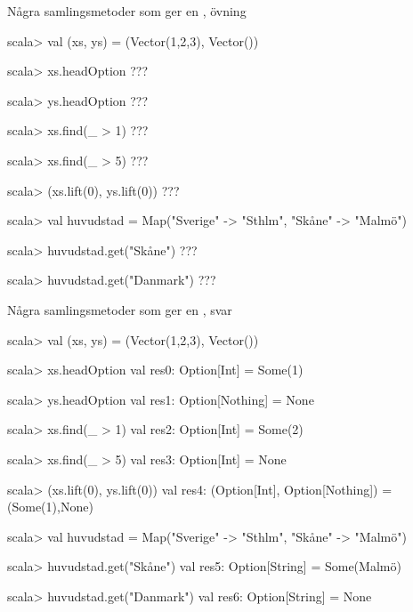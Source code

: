 \begin{Slide}{Några samlingsmetoder som ger en , övning}
\begin{REPLsmall}
scala> val (xs, ys) = (Vector(1,2,3), Vector())

scala> xs.headOption
???

scala> ys.headOption
???

scala> xs.find(_ > 1)
???

scala> xs.find(_ > 5)
???

scala> (xs.lift(0), ys.lift(0))
???

scala> val huvudstad = Map("Sverige" -> "Sthlm", "Skåne" -> "Malmö")

scala> huvudstad.get("Skåne")
???

scala> huvudstad.get("Danmark")
???
\end{REPLsmall}
\end{Slide}

\begin{Slide}{Några samlingsmetoder som ger en , svar}
\begin{REPLsmall}
scala> val (xs, ys) = (Vector(1,2,3), Vector())

scala> xs.headOption
val res0: Option[Int] = Some(1)

scala> ys.headOption
val res1: Option[Nothing] = None

scala> xs.find(_ > 1)
val res2: Option[Int] = Some(2)

scala> xs.find(_ > 5)
val res3: Option[Int] = None

scala> (xs.lift(0), ys.lift(0))
val res4: (Option[Int], Option[Nothing]) = (Some(1),None)

scala> val huvudstad = Map("Sverige" -> "Sthlm", "Skåne" -> "Malmö")

scala> huvudstad.get("Skåne")
val res5: Option[String] = Some(Malmö)

scala> huvudstad.get("Danmark")
val res6: Option[String] = None
\end{REPLsmall}
\end{Slide}
